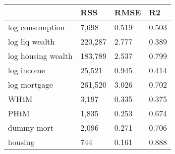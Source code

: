 \begin{table}[htbp]
\centering
\begin{tabular}{llll} \hline \hline
 & RSS  & RMSE  & R2  \\  \hline 
log consumption &     7,698 &     0.519 &     0.503 \\  
log liq wealth &   220,287 &     2.777 &     0.389 \\  
log housing wealth &   183,789 &     2.537 &     0.799 \\  
log income &    25,521 &     0.945 &     0.414 \\  
log mortgage &   261,520 &     3.026 &     0.702 \\  
WHtM &     3,197 &     0.335 &     0.375 \\  
PHtM &     1,835 &     0.253 &     0.674 \\  
dummy mort &     2,096 &     0.271 &     0.706 \\  
housing &       744 &     0.161 &     0.888 \\  
\hline \hline \end{tabular}
\end{table}
